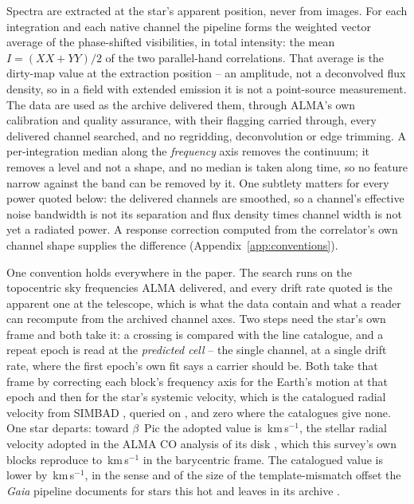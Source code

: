 Spectra are extracted at the star's apparent position, never from images.
For each integration and each native channel the pipeline forms the weighted
vector average of the phase-shifted visibilities, in total intensity: the
mean $I=(XX+YY)/2$ of the two parallel-hand correlations. That average is the
dirty-map value at the extraction position -- an amplitude, not a
deconvolved flux density, so in a field with extended emission it is not a
point-source measurement. The data are used as the archive delivered them,
through ALMA's own calibration and quality assurance, with their flagging
carried through, every delivered channel searched, and no regridding,
deconvolution or edge trimming. A per-integration median along the
\emph{frequency} axis removes the continuum; it removes a level and not a
shape, and no median is taken along time, so no feature narrow against the
band can be removed by it. One
subtlety matters for every power quoted below: the delivered channels are
smoothed, so a channel's effective noise bandwidth is not its separation
and flux density times channel width is not yet a radiated power. A
response correction computed from the correlator's own channel shape
supplies the difference (Appendix~\ref{app:conventions}).

One convention holds everywhere in the paper. The search runs on the
topocentric sky frequencies ALMA delivered, and every drift rate quoted is
the apparent one at the telescope, which is what the data contain and what
a reader can recompute from the archived channel axes. Two steps need the
star's own frame and both take it: a crossing is compared with the line catalogue, and a repeat epoch is read
at the \emph{predicted cell} -- the single channel, at a single drift rate,
where the first epoch's own fit says a carrier should be. Both take that
frame by correcting each block's frequency axis for the Earth's motion at
that epoch and then for the star's systemic velocity, which is the
catalogued radial velocity from SIMBAD \citep{SIMBAD2000}, queried on
\SimbadQueryDate, and zero where the
catalogues give none. One star departs: toward $\beta$~Pic the adopted value
is \BpRecVsys\,km\,s$^{-1}$, the stellar radial velocity adopted in the ALMA
CO analysis of its disk \citep{Matra2017}, which this survey's own blocks
reproduce to \BpRecVsysSpread\,km\,s$^{-1}$ in the barycentric frame. The
catalogued value is lower by \BpRecVsysGaiaDiff\,km\,s$^{-1}$, in the sense
and of the size of the template-mismatch offset the \textit{Gaia} pipeline
documents for stars this hot and leaves in its archive \citep{Blomme2023}.

